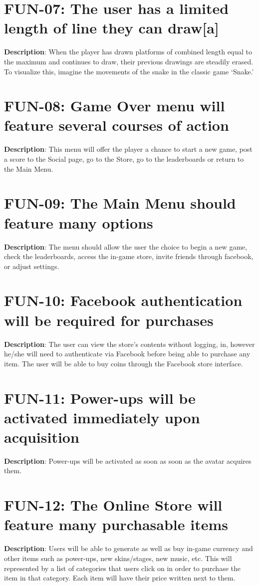 \section{FUN-07: The user has a limited length of line they can draw{[}a{]}}
\textbf{Description}: When the player has drawn platforms of combined
length equal to the maximum and continues to draw, their previous
drawings are steadily erased. To visualize this, imagine the movements
of the snake in the classic game \textquoteleft{}Snake.\textquoteright{}
\section{FUN-08: Game Over menu will feature several courses of action}
\textbf{Description}: This menu will offer the player a chance to
start a new game, post a score to the Social page, go to the Store,
go to the leaderboards or return to the Main Menu.
\section{FUN-09: The Main Menu should feature many options}
\textbf{Description}: The menu should allow the user the choice to
begin a new game, check the leaderboards, access the in-game store,
invite friends through facebook, or adjust settings.
\section{FUN-10: Facebook authentication will be required for purchases}
\textbf{Description}: The user can view the store\textquoteright{}s
contents without logging, in, however he/she will need to authenticate
via Facebook before being able to purchase any item. The user will
be able to buy coins through the Facebook store interface.
\section{FUN-11: Power-ups will be activated immediately upon acquisition }
\textbf{Description}: Power-ups will be activated as soon as soon
as the avatar acquires them.
\section{FUN-12: The Online Store will feature many purchasable items}
\textbf{Description}: Users will be able to generate as well as buy
in-game currency and other items such as power-ups, new skins/stages,
new music, etc. This will represented by a list of categories that
users click on in order to purchase the item in that category. Each
item will have their price written next to them.
